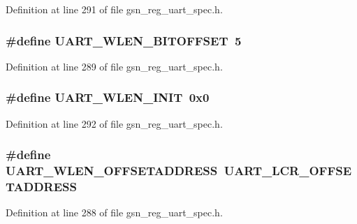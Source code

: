 Definition at line 291 of file gsn\_\-reg\_\-uart\_\-spec.h.

\hypertarget{a00575_a5100b255345fca628e8738973a0cba60}{
\subsubsection[{UART\_\-WLEN\_\-BITOFFSET}]{\setlength{\rightskip}{0pt plus 5cm}\#define UART\_\-WLEN\_\-BITOFFSET~5}}
\label{a00575_a5100b255345fca628e8738973a0cba60}


Definition at line 289 of file gsn\_\-reg\_\-uart\_\-spec.h.

\hypertarget{a00575_aec1e9143b91025a24478022570ff8547}{
\subsubsection[{UART\_\-WLEN\_\-INIT}]{\setlength{\rightskip}{0pt plus 5cm}\#define UART\_\-WLEN\_\-INIT~0x0}}
\label{a00575_aec1e9143b91025a24478022570ff8547}


Definition at line 292 of file gsn\_\-reg\_\-uart\_\-spec.h.

\hypertarget{a00575_a594d5143448a77701c565aed6b888e8f}{
\subsubsection[{UART\_\-WLEN\_\-OFFSETADDRESS}]{\setlength{\rightskip}{0pt plus 5cm}\#define UART\_\-WLEN\_\-OFFSETADDRESS~UART\_\-LCR\_\-OFFSETADDRESS}}
\label{a00575_a594d5143448a77701c565aed6b888e8f}


Definition at line 288 of file gsn\_\-reg\_\-uart\_\-spec.h.

